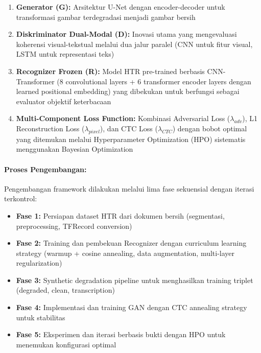 \documentclass[12pt,a4paper]{article}
\begin{document}
\begin{enumerate}[label=\arabic*., leftmargin=0.5cm]
    \item \textbf{Generator (G):} Arsitektur U-Net dengan encoder-decoder untuk transformasi gambar terdegradasi menjadi gambar bersih
    
    \item \textbf{Diskriminator Dual-Modal (D):} Inovasi utama yang mengevaluasi koherensi visual-tekstual melalui dua jalur paralel (CNN untuk fitur visual, LSTM untuk representasi teks)
    
    \item \textbf{Recognizer Frozen (R):} Model HTR pre-trained berbasis CNN-Transformer (8 convolutional layers + 6 transformer encoder layers dengan learned positional embedding) yang dibekukan untuk berfungsi sebagai evaluator objektif keterbacaan
    
    \item \textbf{Multi-Component Loss Function:} Kombinasi Adversarial Loss ($\lambda_{adv}$), L1 Reconstruction Loss ($\lambda_{pixel}$), dan CTC Loss ($\lambda_{CTC}$) dengan bobot optimal yang ditemukan melalui Hyperparameter Optimization (HPO) sistematis menggunakan Bayesian Optimization
\end{enumerate}

\paragraph{Proses Pengembangan:}

Pengembangan framework dilakukan melalui lima fase sekuensial dengan iterasi terkontrol:

\begin{itemize}[leftmargin=*, nosep]
    \item \textbf{Fase 1:} Persiapan dataset HTR dari dokumen bersih (segmentasi, preprocessing, TFRecord conversion)
    \item \textbf{Fase 2:} Training dan pembekuan Recognizer dengan curriculum learning strategy (warmup + cosine annealing, data augmentation, multi-layer regularization)
    \item \textbf{Fase 3:} Synthetic degradation pipeline untuk menghasilkan training triplet (degraded, clean, transcription)
    \item \textbf{Fase 4:} Implementasi dan training GAN dengan CTC annealing strategy untuk stabilitas
    \item \textbf{Fase 5:} Eksperimen dan iterasi berbasis bukti dengan HPO untuk menemukan konfigurasi optimal
\end{itemize}
\end{document}
